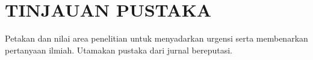 \chapter{TINJAUAN PUSTAKA}
Petakan dan nilai area penelitian untuk menyadarkan urgensi serta membenarkan pertanyaan ilmiah.
Utamakan pustaka dari jurnal bereputasi.
